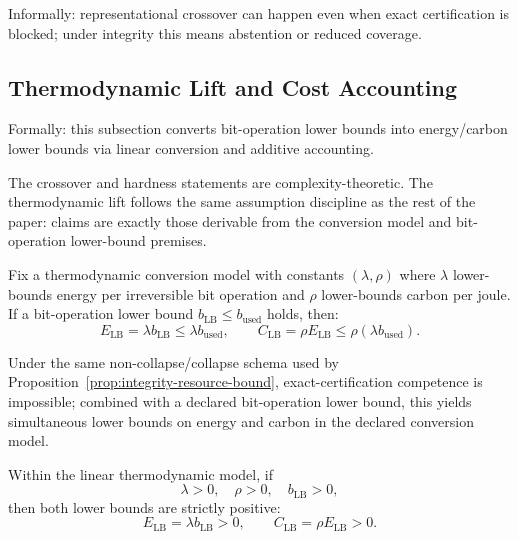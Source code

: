 Informally: representational crossover can happen even when exact certification is blocked; under integrity this means abstention or reduced coverage.

\subsection{Thermodynamic Lift and Cost Accounting}
Formally: this subsection converts bit-operation lower bounds into energy/carbon lower bounds via linear conversion and additive accounting.

The crossover and hardness statements are complexity-theoretic.
The thermodynamic lift follows the same assumption discipline as the rest of the paper:
claims are exactly those derivable from the conversion model and bit-operation lower-bound premises.

\begin{proposition}\label{prop:thermo-lift}
Fix a thermodynamic conversion model with constants $(\lambda,\rho)$ where $\lambda$ lower-bounds energy per irreversible bit operation and $\rho$ lower-bounds carbon per joule. If a bit-operation lower bound $b_{\mathrm{LB}} \le b_{\mathrm{used}}$ holds, then:
\[
E_{\mathrm{LB}}=\lambda b_{\mathrm{LB}} \le \lambda b_{\mathrm{used}},\qquad
C_{\mathrm{LB}}=\rho E_{\mathrm{LB}} \le \rho(\lambda b_{\mathrm{used}}).
\]
\end{proposition}

\begin{proposition}\label{prop:thermo-hardness-bundle}
Under the same non-collapse/collapse schema used by Proposition~\ref{prop:integrity-resource-bound}, exact-certification competence is impossible; combined with a declared bit-operation lower bound, this yields simultaneous lower bounds on energy and carbon in the declared conversion model.
\end{proposition}

\begin{proposition}\label{prop:thermo-mandatory-cost}
Within the linear thermodynamic model, if
\[
\lambda > 0,\quad \rho > 0,\quad b_{\mathrm{LB}} > 0,
\]
then both lower bounds are strictly positive:
\[
E_{\mathrm{LB}}=\lambda b_{\mathrm{LB}} > 0,\qquad
C_{\mathrm{LB}}=\rho E_{\mathrm{LB}} > 0.
\]
\end{proposition}

